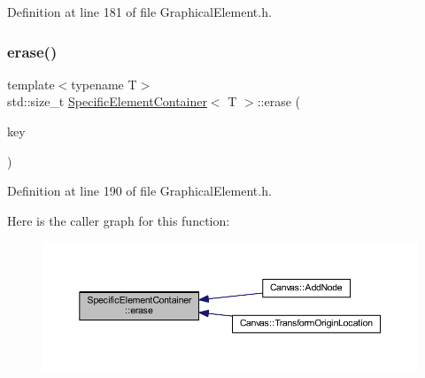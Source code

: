 Definition at line 181 of file Graphical\+Element.\+h.

\mbox{\label{class_specific_element_container_ae08e116cb7638a4d4d10a830185f502e}} 
\subsubsection{\texorpdfstring{erase()}{erase()}\hspace{0.1cm}{\footnotesize\ttfamily [1/2]}}
{\footnotesize\ttfamily template$<$typename T$>$ \\
std\+::size\+\_\+t \hyperlink{class_specific_element_container}{Specific\+Element\+Container}$<$ T $>$\+::erase (\begin{DoxyParamCaption}\item[{const \hyperlink{_graphical_element_8h_ade5fd6c85839a416577ff9de1605141e}{Element\+Key} \&}]{key }\end{DoxyParamCaption})\hspace{0.3cm}{\ttfamily [inline]}}



Definition at line 190 of file Graphical\+Element.\+h.

Here is the caller graph for this function\+:
\nopagebreak
\begin{figure}[H]
\begin{center}
\leavevmode
\includegraphics[width=350pt]{class_specific_element_container_ae08e116cb7638a4d4d10a830185f502e_icgraph}
\end{center}
\end{figure}
\mbox{\label{class_specific_element_container_a2d5e472917fc500714586e9c115f8da6}} 
